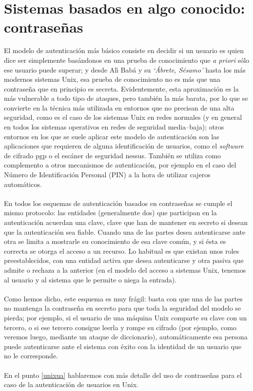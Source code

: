 \section{Sistemas basados en algo conocido: contrase\~nas}
El modelo de autenticaci\'on m\'as b\'asico consiste en decidir si un usuario
es quien dice ser simplemente bas\'andonos en una prueba de conocimiento que
{\it a priori} s\'olo ese usuario puede superar; y desde Al\'{\i} Bab\'a y su
{\it `\'Abrete, S\'esamo'} hasta los m\'as modernos sistemas Unix, esa prueba
de conocimiento no es m\'as que una contrase\~na que en principio es secreta.
Evidentemente, esta aproximaci\'on es la m\'as vulnerable a todo tipo de 
ataques, pero tambi\'en la m\'as barata, por lo que se convierte en la 
t\'ecnica m\'as utilizada en entornos que no precisan de una alta seguridad, 
como es el caso de los sistemas Unix en redes normales (y en general en todos 
los
sistemas operativos en redes de seguridad media--baja); otros entornos en los
que se suele aplicar este modelo de autenticaci\'on son las aplicaciones que
requieren de alguna identificaci\'on de usuarios, como el {\it software} de 
cifrado {\sc pgp} o el esc\'aner de seguridad {\sc nessus}. Tambi\'en se 
utiliza como complemento a otros mecanismos de autenticaci\'on, por ejemplo en 
el caso del N\'umero de Identificaci\'on Personal (PIN) a la hora de utilizar 
cajeros autom\'aticos.\\
\\En todos los esquemas de autenticaci\'on basados en contrase\~nas se cumple
el mismo protocolo: las entidades (generalmente dos) que participan en la 
autenticaci\'on 
acuerdan una clave, clave que han de mantener en secreto si desean que la 
autenticaci\'on sea fiable. Cuando una de las partes desea autenticarse ante
otra se limita a mostrarle su conocimiento de esa clave com\'un, y si \'esta
es correcta se otorga el acceso a un recurso. Lo habitual es que existan unos
roles preestablecidos, con una entidad activa que desea autenticarse y otra
pasiva que admite o rechaza a la anterior (en el modelo del acceso a sistemas
Unix, tenemos al usuario y al sistema que le permite o niega la entrada).\\
\\Como hemos dicho, este esquema es muy fr\'agil: basta con que una de las
partes no mantenga la contrase\~na en secreto para que toda la seguridad del
modelo se pierda; por ejemplo, si el usuario de una m\'aquina Unix comparte
su clave con un tercero, o si ese tercero consigue leerla y rompe su cifrado 
(por ejemplo, como veremos luego, mediante un ataque de diccionario), 
autom\'aticamente esa persona puede autenticarse ante el sistema con \'exito
con la identidad de un usuario que no le corresponde.\\
\\En el punto \ref{unixua} hablaremos con m\'as detalle del uso de 
contrase\~nas para el caso de la autenticaci\'on de usuarios en Unix.
